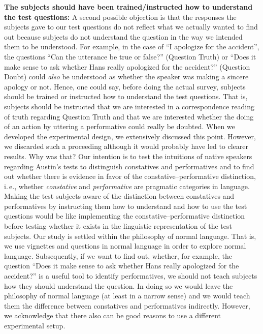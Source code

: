 \documentclass[egregdoesnotlikesansseriftitles,12pt]{scrartcl}
\begin{document}
\noindent\textbf{The subjects should have been trained/instructed how to understand the test questions:} A second possible objection is that the responses the subjects gave to our test questions do not reflect what we actually wanted to find out because subjects do not understand the question in the way we intended them to be understood. For example, in the case of ``I apologize for the accident'', the questions ``Can the utterance be true or false?'' (Question Truth) or ``Does it make sense to ask whether Hans really apologized for the accident?'' (Question Doubt) could \textit{also} be understood as whether the speaker was making a sincere apology or not. Hence, one could say, before doing the actual survey, subjects should be trained or instructed how to understand the test questions. That is, subjects should be instructed that we are interested in a correspondence reading of truth regarding Question Truth and that we are interested whether the doing of an action by uttering a performative could really be doubted. When we developed the experimental design, we extensively discussed this point. However, we discarded such a proceeding although it would probably have led to clearer results. Why was that? Our intention is to test the intuitions of native speakers regarding Austin's tests to distinguish constatives and performatives and to find out whether there is evidence in favor of the constative--performative distinction, i.\,e., whether \textit{constative} and \textit{performative} are pragmatic categories in language. Making the test subjects aware of the distinction between constatives and performatives by instructing them how to understand and how to use the test questions would be like implementing the constative--performative distinction before testing whether it exists in the linguistic representation of the test subjects. Our study is settled within the philosophy of normal language. That is, we use vignettes and questions in normal language in order to explore normal language. Subsequently, if we want to find out, whether, for example, the question ``Does it make sense to ask whether Hans really apologized for the accident?'' is a useful tool to identify performatives, we should not teach subjects how they should understand the question. In doing so we would leave the philosophy of normal language (at least in a narrow sense) and we would teach them the difference between constatives and performatives indirectly. However, we acknowledge that there also can be good reasons to use a different experimental setup.\\ 
\end{document}
